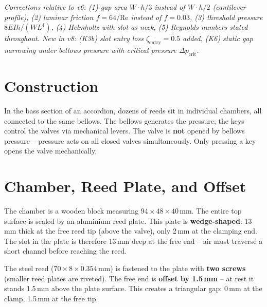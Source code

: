\documentclass[11pt,a4paper]{article}
\begin{document}
\hbmaketitle

{\small\itshape Corrections relative to v6: (1) gap area $W \cdot h/3$ instead of $W \cdot h/2$ (cantilever profile), (2) laminar friction $f=64/\text{Re}$ instead of $f=0.03$, (3) threshold pressure $8EIh/(WL^4)$, (4) Helmholtz with slot as neck, (5) Reynolds numbers stated throughout. New in v8: (K3b) slot entry loss $\zeta_\text{entry}=0.5$ added, (K6) static gap narrowing under bellows pressure with critical pressure $\Delta p_\text{crit}$.}

\vspace{4mm}

\section{Construction}

\begin{keybox}
In the bass section of an accordion, dozens of reeds sit in individual chambers, all connected to the same bellows. The bellows generates the pressure; the keys control the valves via mechanical levers. The valve is \textbf{not} opened by bellows pressure -- pressure acts on all closed valves simultaneously. Only pressing a key opens the valve mechanically.
\end{keybox}

\section{Chamber, Reed Plate, and Offset}

The chamber is a wooden block measuring $94 \times 48 \times 40$\,mm. The entire top surface is sealed by an aluminium reed plate. This plate is \textbf{wedge-shaped}: 13\,mm thick at the free reed tip (above the valve), only 2\,mm at the clamping end. The slot in the plate is therefore 13\,mm deep at the free end -- air must traverse a short channel before reaching the reed.

The steel reed ($70 \times 8 \times 0.354$\,mm) is fastened to the plate with \textbf{two screws} (smaller reed plates are riveted). The free end is \textbf{offset by 1.5\,mm} -- at rest it stands 1.5\,mm above the plate surface. This creates a triangular gap: 0\,mm at the clamp, 1.5\,mm at the free tip.
\end{document}
